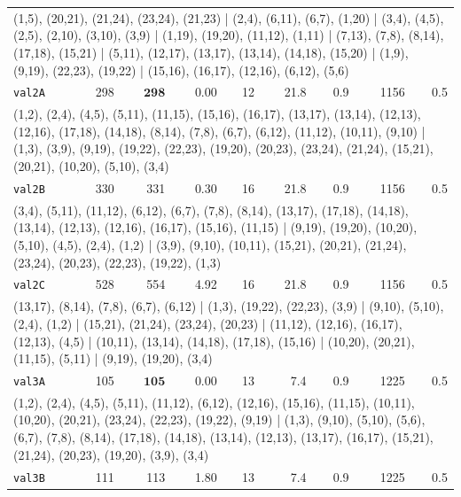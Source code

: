 \begin{landscape}
\begin{longtable}{lrrrrrrrr}
\multicolumn{9}{p{0.96\linewidth}}{\tiny\raggedright\arraybackslash (1,5), (20,21), (21,24), (23,24), (21,23) | (2,4), (6,11), (6,7), (1,20) | (3,4), (4,5), (2,5), (2,10), (3,10), (3,9) | (1,19), (19,20), (11,12), (1,11) | (7,13), (7,8), (8,14), (17,18), (15,21) | (5,11), (12,17), (13,17), (13,14), (14,18), (15,20) | (1,9), (9,19), (22,23), (19,22) | (15,16), (16,17), (12,16), (6,12), (5,6)} \\[2pt]
\texttt{val2A} & 298 & $\mathbf{298}$ & 0.00 & 12 & 21.8 & 0.9 & 1156 & 0.5 \\
\multicolumn{9}{p{0.96\linewidth}}{\tiny\raggedright\arraybackslash (1,2), (2,4), (4,5), (5,11), (11,15), (15,16), (16,17), (13,17), (13,14), (12,13), (12,16), (17,18), (14,18), (8,14), (7,8), (6,7), (6,12), (11,12), (10,11), (9,10) | (1,3), (3,9), (9,19), (19,22), (22,23), (19,20), (20,23), (23,24), (21,24), (15,21), (20,21), (10,20), (5,10), (3,4)} \\[2pt]
\texttt{val2B} & 330 & 331 & 0.30 & 16 & 21.8 & 0.9 & 1156 & 0.5 \\
\multicolumn{9}{p{0.96\linewidth}}{\tiny\raggedright\arraybackslash (3,4), (5,11), (11,12), (6,12), (6,7), (7,8), (8,14), (13,17), (17,18), (14,18), (13,14), (12,13), (12,16), (16,17), (15,16), (11,15) | (9,19), (19,20), (10,20), (5,10), (4,5), (2,4), (1,2) | (3,9), (9,10), (10,11), (15,21), (20,21), (21,24), (23,24), (20,23), (22,23), (19,22), (1,3)} \\[2pt]
\texttt{val2C} & 528 & 554 & 4.92 & 16 & 21.8 & 0.9 & 1156 & 0.5 \\
\multicolumn{9}{p{0.96\linewidth}}{\tiny\raggedright\arraybackslash (13,17), (8,14), (7,8), (6,7), (6,12) | (1,3), (19,22), (22,23), (3,9) | (9,10), (5,10), (2,4), (1,2) | (15,21), (21,24), (23,24), (20,23) | (11,12), (12,16), (16,17), (12,13), (4,5) | (10,11), (13,14), (14,18), (17,18), (15,16) | (10,20), (20,21), (11,15), (5,11) | (9,19), (19,20), (3,4)} \\[2pt]
\texttt{val3A} & 105 & $\mathbf{105}$ & 0.00 & 13 & 7.4 & 0.9 & 1225 & 0.5 \\
\multicolumn{9}{p{0.96\linewidth}}{\tiny\raggedright\arraybackslash (1,2), (2,4), (4,5), (5,11), (11,12), (6,12), (12,16), (15,16), (11,15), (10,11), (10,20), (20,21), (23,24), (22,23), (19,22), (9,19) | (1,3), (9,10), (5,10), (5,6), (6,7), (7,8), (8,14), (17,18), (14,18), (13,14), (12,13), (13,17), (16,17), (15,21), (21,24), (20,23), (19,20), (3,9), (3,4)} \\[2pt]
\texttt{val3B} & 111 & 113 & 1.80 & 13 & 7.4 & 0.9 & 1225 & 0.5 \\

\end{longtable}
\end{landscape}
